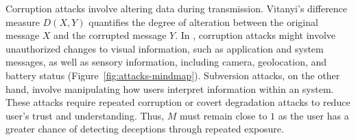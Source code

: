 Corruption attacks involve altering data during transmission. Vitanyi's difference measure \({D(X, Y)}\) quantifies the degree of alteration between the original message \({X}\) and the corrupted message \({Y}\).  
In \MR, corruption attacks might involve unauthorized changes to visual information, such as application and system messages, as well as sensory information, including camera, geolocation, and battery status (Figure~\ref{fig:attacks-mindmap}).
Subversion attacks, on the other hand, involve  manipulating how users interpret information within an \MR system. These attacks require repeated corruption or covert degradation attacks to reduce user's trust and understanding.
Thus, $M$ must remain close to $1$ as the user has a greater chance of detecting deceptions through repeated exposure.


